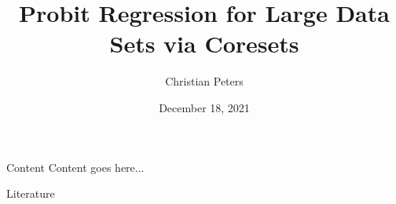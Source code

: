 \documentclass[gray]{beamer}
\title{Probit Regression for Large Data Sets via Coresets}
\author{Christian Peters}
\institute{TU Dortmund University, Germany}
\date{December 18, 2021}
\begin{document}
\maketitle

\begin{frame}{Content}
    Content goes here...
\end{frame}

\begin{frame}[allowframebreaks]{Literature}
    \nocite{*}
    
    
\end{frame}
\end{document}
